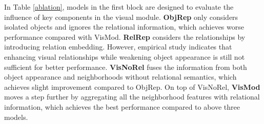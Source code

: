 \documentclass[letterpaper]{article} \usepackage{aaai20}  \usepackage{times}  \usepackage{helvet} \usepackage{courier}  \usepackage[hyphens]{url}  \usepackage{graphicx} \urlstyle{rm} \def\UrlFont{\rm}  \usepackage{graphicx}  \frenchspacing  \setlength{\pdfpagewidth}{8.5in}  \setlength{\pdfpageheight}{11in}  \usepackage{mathrsfs} \usepackage{amsfonts,amssymb}  \usepackage{tabularx} \usepackage{url}
\begin{document}
\fi



\begin{table}[t] 
\caption{Ablation study of DualVD on VisDial v1.0.}
\label{ablation}
\end{table} 



In Table \ref{ablation}, models in the first block are designed to evaluate the influence of key components in the visual module.  \textbf{ObjRep} only considers isolated objects and ignores the relational information, which achieves worse performance compared with VisMod. \textbf{RelRep} considers the relationships by introducing relation embedding. However, empirical study indicates that enhancing visual relationships while weakening object appearance is still not sufficient for better performance. \textbf{VisNoRel} fuses the information from both object appearance and neighborhoods without relational semantics, which achieves slight improvement compared to ObjRep. On top of VisNoRel, \textbf{VisMod} moves a step further by aggregating all the neighborhood features with relational information, which achieves the best performance compared to above three models. 
\end{document}
